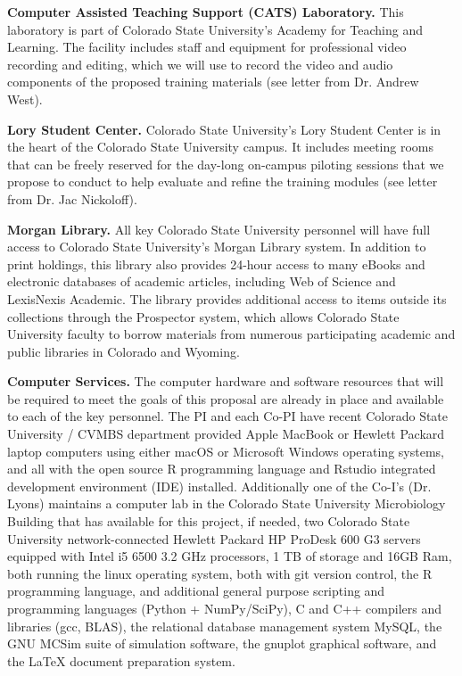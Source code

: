 \documentclass[pdftex,english,11.5pt,parskip=half]{scrartcl}
\begin{document}
\textbf{Computer Assisted Teaching Support (CATS) Laboratory.} This laboratory is part of Colorado State University's Academy for Teaching and Learning. The facility includes staff and equipment for professional video recording and editing, which we will use to record the video and audio components of the proposed training materials (see letter from Dr. Andrew West). 

\textbf{Lory Student Center.} Colorado State University's Lory Student Center is in the heart of the Colorado State University campus. It includes meeting rooms that can be freely reserved for the day-long on-campus piloting sessions that we propose to conduct to help evaluate and refine the training modules (see letter from Dr. Jac Nickoloff).

\textbf{Morgan Library.} All key Colorado State University personnel will have full access to Colorado State University's Morgan Library system. In addition to print holdings, this library also provides 24-hour access to many eBooks and electronic databases of academic articles, including Web of Science and LexisNexis Academic. The library provides additional access to items outside its collections through the Prospector system, which allows Colorado State University faculty to borrow materials from numerous participating academic and public libraries in Colorado and Wyoming. 

\textbf{Computer Services.} The computer hardware and software resources that
will be required to meet the goals of this proposal are already in place and
available to each of the key personnel.  The PI and each Co-PI have recent Colorado State University
/ CVMBS department provided Apple MacBook or Hewlett Packard laptop computers
using either macOS or Microsoft Windows operating systems, and all with the
open
source R programming language and Rstudio integrated development environment
(IDE) installed.  Additionally one of the Co-I's (Dr. Lyons) maintains a
computer lab in the Colorado State University Microbiology Building that has available for this
project, if needed, two Colorado State University network-connected Hewlett Packard HP ProDesk
600 G3 servers equipped with Intel i5 6500 3.2 GHz processors, 1 TB of
storage and 16GB Ram,  both running the linux operating system, both with
git version control, the R programming language, and additional
general purpose scripting and programming languages (Python + NumPy/SciPy),
C and C++ compilers and libraries (gcc, BLAS), the relational database
management system MySQL, the GNU MCSim suite of simulation software, the
gnuplot graphical software, and the LaTeX document preparation system.
\end{document}
